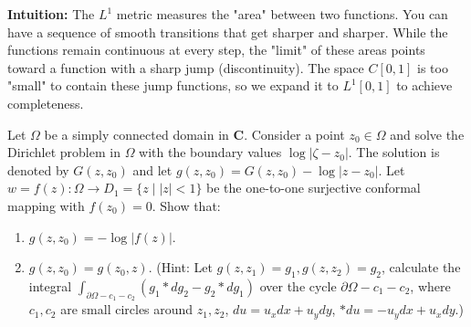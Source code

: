 \begin{solution}
\par\vspace{\baselineskip}
\textbf{Intuition:} 
The $L^1$ metric measures the "area" between two functions. You can have a sequence of smooth transitions that get sharper and sharper. While the functions remain continuous at every step, the "limit" of these areas points toward a function with a sharp jump (discontinuity). The space $C[0,1]$ is too "small" to contain these jump functions, so we expand it to $L^1[0,1]$ to achieve completeness.
\end{solution}

\begin{exercise}
\label{analysis:2018:11}
Let $\Omega$ be a simply connected domain in $\mathbf{C}$. Consider a point $z_0 \in \Omega$ and solve the Dirichlet problem in $\Omega$ with the boundary values $\log |\zeta - z_0|$. The solution is denoted by $G(z, z_0)$ and let $g(z, z_0) = G(z, z_0) - \log |z - z_0|$. Let $w = f(z): \Omega \to D_1 = \{z \mid |z| < 1\}$ be the one-to-one surjective conformal mapping with $f(z_0) = 0$. Show that:
\begin{enumerate}
    \item $g(z, z_0) = -\log |f(z)|$.
    \item $g(z, z_0) = g(z_0, z)$. (Hint: Let $g(z, z_1) = g_1, g(z, z_2) = g_2$, calculate the integral $\int_{\partial\Omega - c_1 - c_2} (g_1 *dg_2 - g_2 *dg_1)$ over the cycle $\partial \Omega - c_1 - c_2$, where $c_1, c_2$ are small circles around $z_1, z_2$, $du = u_x dx + u_y dy$, $*du = -u_y dx + u_x dy$.)
\end{enumerate}
\end{exercise}


